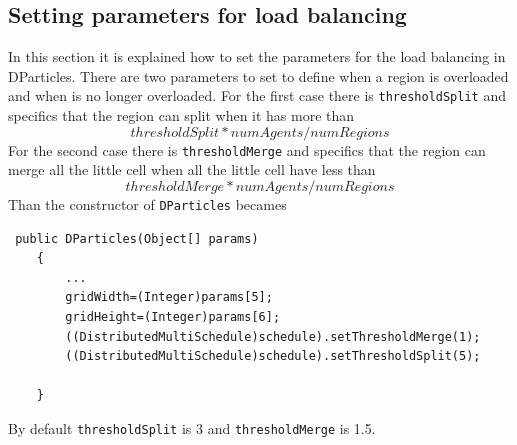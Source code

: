 \documentclass{book}
\begin{document}
\subsection{Setting parameters for load balancing}
In this section it is explained how to set the parameters for the load balancing in DParticles. There are two parameters to set to define when a region is overloaded and when is no longer overloaded. For the first case there is  \texttt{thresholdSplit} and specifics that the region can split when it has more than \[thresholdSplit*numAgents/numRegions\] For the second case there is  \texttt{thresholdMerge} and specifics that the region can merge all the little cell when all the little cell have less than \[thresholdMerge*numAgents/numRegions\] Than the constructor of  \texttt{DParticles} becames 

\begin{lstlisting}
 public DParticles(Object[] params)
    {    	
    	...
    	gridWidth=(Integer)params[5];
    	gridHeight=(Integer)params[6];
    	((DistributedMultiSchedule)schedule).setThresholdMerge(1);
        ((DistributedMultiSchedule)schedule).setThresholdSplit(5);

    }    
\end{lstlisting}

By default \texttt{thresholdSplit} is 3 and \texttt{thresholdMerge} is 1.5.
\end{document}
